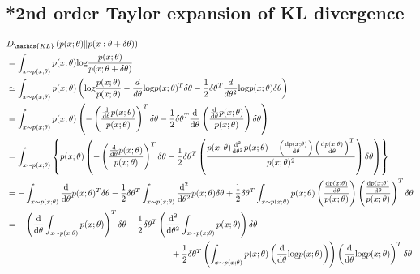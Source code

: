 \documentclass{article}
\begin{document}
	 \subsection{*2nd order Taylor expansion of KL divergence}
	 \begin{align}
	 &D_{\mathds{KL}}\left(p(x;\theta)\|p(x:\theta+\delta\theta)\right)\notag\\
	 &= \int_{x\sim p(x;\theta)}p(x;\theta)\text{log}\frac{p(x;\theta)}{p(x;\theta+\delta\theta)}\notag\\
	 &\simeq  \int_{x\sim p(x;\theta)}p(x;\theta)\left(\text{log}\frac{p(x;\theta)}{p(x;\theta)} - \frac{d}{d\theta}\text{log}p(x;\theta)^T\delta\theta-\frac{1}{2}\delta\theta^T\frac{d}{d\theta^2}\text{log}p(x;\theta)\delta\theta\right)\notag\\
	 &= \int_{x\sim p(x;\theta)}p(x;\theta)\left(-\left(\frac{\frac{\text{d}}{\text{d}\theta}p(x;\theta)}{p(x;\theta)}\right)^T\delta\theta-\frac{1}{2}\delta\theta^T\frac{\text{d}}{\text{d}\theta}\left(\frac{\frac{\text{d}}{\text{d}\theta}p(x;\theta)}{p(x;\theta)}\right)\delta\theta\right)\notag\\
	 &= \int_{x\sim p(x;\theta)}\left\{p(x;\theta)\left(-\left(\frac{\frac{\text{d}}{\text{d}\theta}p(x;\theta)}{p(x;\theta)}\right)^T\delta\theta-\frac{1}{2}\delta\theta^T\left(\frac{p(x;\theta)\frac{\text{d}^2}{\text{d}\theta^2}p(x;\theta)-\left(\frac{\text{d}p(x;\theta)}{\text{d}\theta}\right)\left(\frac{\text{d}p(x;\theta)}{\text{d}\theta}\right)^T }{p(x;\theta)^2}\right)\delta\theta\right)\right\}\notag\\
	 &= -\int_{x\sim p(x;\theta)}\frac{\text{d}}{\text{d}\theta}p(x;\theta)^T\delta\theta - \frac{1}{2}\delta\theta^T\int_{x\sim p(x;\theta)}\frac{\text{d}^2}{\text{d}\theta^2}p(x;\theta)\delta\theta +\frac{1}{2}\delta\theta^T\int_{x\sim p(x;\theta)}p(x;\theta)\left(\frac{\frac{\text{d}p(x;\theta)}{\text{d}\theta}}{p(x;\theta)}\right)\left(\frac{\frac{\text{d}p(x;\theta)}{\text{d}\theta}}{p(x;\theta)}\right)^T\delta\theta\notag\\
	 &=-\left(\frac{\text{d}}{\text{d}\theta}\int_{x\sim p(x;\theta)}p(x;\theta)\right)^T\delta\theta - \frac{1}{2}\delta\theta^T\left(\frac{\text{d}^2}{\text{d}\theta^2}\int_{x\sim p(x;\theta)}p(x;\theta)\right)\delta\theta\notag\\
	 &\quad\quad\quad\quad\quad\quad\quad\quad\quad\quad\quad\quad\quad\quad\quad\quad\quad\quad\quad
	 + \frac{1}{2}\delta\theta^T\left(\int_{x\sim p(x;\theta)}p(x;\theta)\left(\frac{\text{d}}{\text{d}\theta}\text{log}p(x;\theta)\right)\right)\left(\frac{\text{d}}{\text{d}\theta}\text{log}p(x;\theta)\right)^T\delta\theta\notag\\

\end{align}
\end{document}
